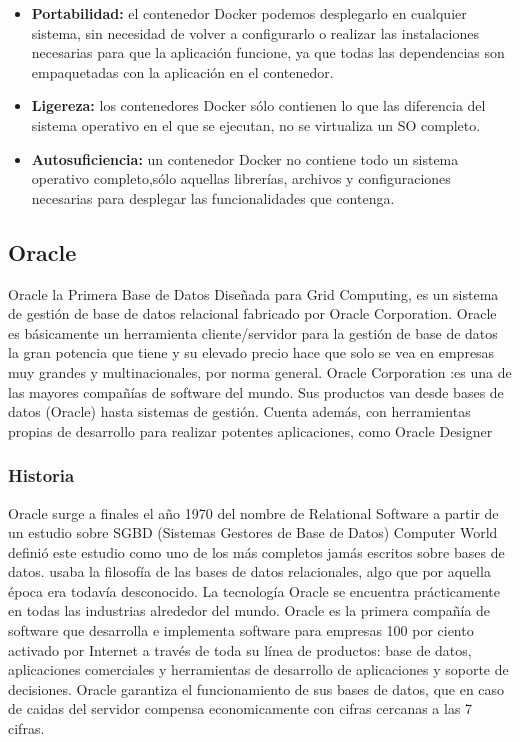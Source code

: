 \documentclass[preprint,12pt]{elsarticle}
\begin{document}
\begin{itemize}
\item \textbf{Portabilidad:} el contenedor Docker podemos desplegarlo en cualquier sistema, sin necesidad de volver a configurarlo o realizar las instalaciones necesarias para que la aplicación funcione, ya que todas las dependencias son empaquetadas con la aplicación en el contenedor.

\item \textbf{Ligereza:} los contenedores Docker sólo contienen lo que las diferencia del sistema operativo en el que se ejecutan, no se virtualiza un SO completo.

\item \textbf{Autosuficiencia:} un contenedor Docker no contiene todo un sistema operativo completo,sólo aquellas librerías, archivos y configuraciones necesarias para desplegar las funcionalidades que contenga.
\end{itemize}


\subsection{\textbf{Oracle}}
Oracle la Primera Base de Datos Diseñada para Grid Computing, es un sistema de gestión de base de datos relacional fabricado por Oracle Corporation.
Oracle es básicamente un herramienta cliente/servidor para la gestión de base de datos la gran potencia que tiene y su elevado precio hace que solo se vea en empresas muy grandes y multinacionales, por norma general.
Oracle Corporation :es una de las mayores compañías de software del mundo. Sus productos van desde bases de datos (Oracle) hasta sistemas de gestión. Cuenta además, con herramientas propias de desarrollo para realizar potentes aplicaciones, como Oracle Designer
\subsubsection{\textbf{Historia}}
Oracle surge a finales el año 1970 del nombre de Relational Software a partir de un estudio sobre SGBD (Sistemas Gestores de Base de Datos) Computer World definió este estudio como uno de los más completos jamás escritos sobre bases de datos.
usaba la filosofía de las bases de datos relacionales, algo que por aquella época era todavía desconocido.
La tecnología Oracle se encuentra prácticamente en todas las industrias alrededor del mundo.
Oracle es la primera compañía de software que desarrolla e implementa software para empresas 100 por ciento activado por Internet a través de toda su línea de productos: base de datos, aplicaciones comerciales y herramientas de desarrollo de aplicaciones y soporte de decisiones.
Oracle garantiza el funcionamiento de sus bases de datos, que en caso de caidas del servidor compensa economicamente con cifras cercanas a las 7 cifras. 
\end{document}
